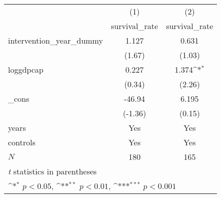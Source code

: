 {
\def\sym#1{\ifmmode^{#1}\else\(^{#1}\)\fi}
\begin{tabular}{l*{2}{c}}
\hline\hline
            &\multicolumn{1}{c}{(1)}&\multicolumn{1}{c}{(2)}\\
            &\multicolumn{1}{c}{survival\_rate}&\multicolumn{1}{c}{survival\_rate}\\
\hline
intervention\_year\_dummy&       1.127         &       0.631         \\
            &      (1.67)         &      (1.03)         \\
[1em]
loggdpcap   &       0.227         &       1.374\sym{*}  \\
            &      (0.34)         &      (2.26)         \\
[1em]
\_cons      &      -46.94         &       6.195         \\
            &     (-1.36)         &      (0.15)         \\
[1em]
years       &         Yes         &         Yes         \\
[1em]
controls    &         Yes         &         Yes         \\
\hline
\(N\)       &         180         &         165         \\
\hline\hline
\multicolumn{3}{l}{\footnotesize \textit{t} statistics in parentheses}\\
\multicolumn{3}{l}{\footnotesize \sym{*} \(p<0.05\), \sym{**} \(p<0.01\), \sym{***} \(p<0.001\)}\\
\end{tabular}
}
